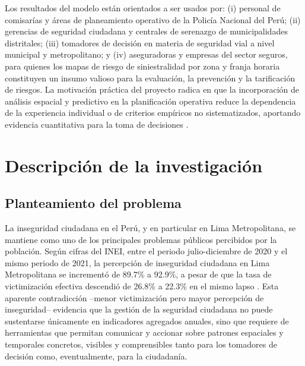 \documentclass[12pt,letterpaper]{report}
\begin{document}
Los resultados del modelo est\'an orientados a ser usados por: (i) personal de comisar\'ias y \'areas de planeamiento operativo de la Polic\'ia Nacional del Per\'u; (ii) gerencias de seguridad ciudadana y centrales de serenazgo de municipalidades distritales; (iii) tomadores de decisi\'on en materia de seguridad vial a nivel municipal y metropolitano; y (iv) aseguradoras y empresas del sector seguros, para quienes los mapas de riesgo de siniestralidad por zona y franja horaria constituyen un insumo valioso para la evaluaci\'on, la prevenci\'on y la tarificaci\'on de riesgos. La motivaci\'on pr\'actica del proyecto radica en que la incorporaci\'on de an\'alisis espacial y predictivo en la planificaci\'on operativa reduce la dependencia de la experiencia individual o de criterios emp\'iricos no sistematizados, aportando evidencia cuantitativa para la toma de decisiones \citep{eck2005mapping}.

\newpage

\chapter{Descripci\'on de la investigaci\'on}

\section{Planteamiento del problema}

La inseguridad ciudadana en el Per\'u, y en particular en Lima Metropolitana, se mantiene como uno de los principales problemas p\'ublicos percibidos por la poblaci\'on. Seg\'un cifras del INEI, entre el periodo julio-diciembre de 2020 y el mismo periodo de 2021, la percepci\'on de inseguridad ciudadana en Lima Metropolitana se increment\'o de 89.7\% a 92.9\%, a pesar de que la tasa de victimizaci\'on efectiva descendi\'o de 26.8\% a 22.3\% en el mismo lapso \citep{inei2022sistema}. Esta aparente contradicci\'on --menor victimizaci\'on pero mayor percepci\'on de inseguridad-- evidencia que la gesti\'on de la seguridad ciudadana no puede sustentarse \'unicamente en indicadores agregados anuales, sino que requiere de herramientas que permitan comunicar y accionar sobre patrones espaciales y temporales concretos, visibles y comprensibles tanto para los tomadores de decisi\'on como, eventualmente, para la ciudadan\'ia.
\end{document}
